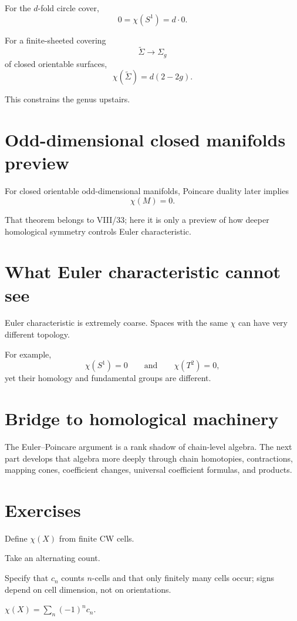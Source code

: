 For the \(d\)-fold circle cover,
\[
0=\chi(S^1)=d\cdot0.
\]

For a finite-sheeted covering
\[
\widetilde\Sigma\to\Sigma_g
\]
of closed orientable surfaces,
\[
\chi(\widetilde\Sigma)
=
d(2-2g).
\]

This constrains the genus upstairs.

\section{Odd-dimensional closed manifolds preview}

For closed orientable odd-dimensional manifolds, Poincare duality later implies
\[
\chi(M)=0.
\]

That theorem belongs to VIII/33; here it is only a preview of how deeper
homological symmetry controls Euler characteristic.

\section{What Euler characteristic cannot see}

Euler characteristic is extremely coarse.  Spaces with the same \(\chi\) can
have very different topology.

For example,
\[
\chi(S^1)=0
\qquad\text{and}\qquad
\chi(T^2)=0,
\]
yet their homology and fundamental groups are different.

\section{Bridge to homological machinery}

The Euler--Poincare argument is a rank shadow of chain-level algebra.  The next
part develops that algebra more deeply through chain homotopies, contractions,
mapping cones, coefficient changes, universal coefficient formulas, and
products.


\section{Exercises}

\begin{exercise}\label{exr:viii21-01}
Define \(\chi(X)\) from finite CW cells.
\end{exercise}
\begin{hint}
Take an alternating count.

Specify that \(c_n\) counts \(n\)-cells and that only finitely many cells occur; signs depend on cell dimension, not on orientations.
\end{hint}
\begin{solution}
\(\chi(X)=\sum_n(-1)^nc_n\).
\end{solution}

